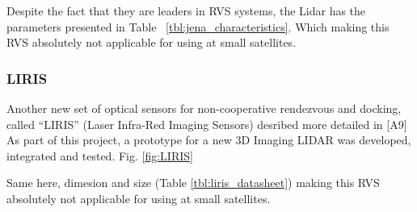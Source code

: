 Despite the fact that they are leaders in RVS systems, the Lidar has the parameters presented in Table ~\ref{tbl:jena_characteristics}.
Which making this RVS absolutely not applicable for using at small satellites.

\subsubsection{LIRIS}
Another new set of optical sensors for non-cooperative rendezvous and docking, called “LIRIS” (Laser Infra-Red Imaging Sensors) desribed more detailed in [A9]
As part of this project, a prototype for a new 3D Imaging LIDAR was developed, integrated and tested. Fig. \ref{fig:LIRIS}
\begin{figure}[h]
\begin{floatrow}
\end{floatrow}
\end{figure}

Same here, dimesion and size (Table \ref{tbl:liris_datasheet}) making this RVS absolutely not applicable for using at small satellites.


